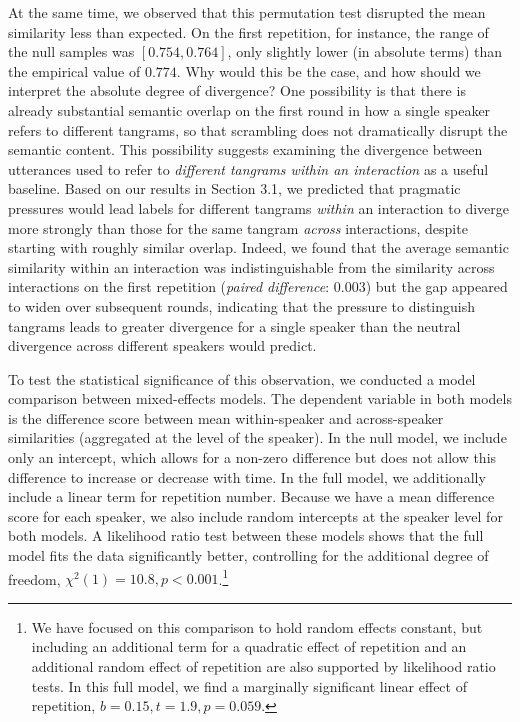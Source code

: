 \documentclass[alpha-refs]{wiley-article}
\begin{document}
At the same time, we observed that this permutation test disrupted the mean similarity less than expected.
On the first repetition, for instance, the range of the null samples was $[0.754, 0.764]$, only slightly lower (in absolute terms) than the empirical value of $0.774$.
Why would this be the case, and how should we interpret the absolute degree of divergence?
One possibility is that there is already substantial semantic overlap on the first round in how a single speaker refers to different tangrams, so that scrambling does not dramatically disrupt the semantic content.
This possibility suggests examining the divergence between utterances used to refer to \emph{different tangrams within an interaction} as a useful baseline.
Based on our results in Section 3.1, we predicted that pragmatic pressures would lead labels for different tangrams \emph{within} an interaction to diverge more strongly than those for the same tangram \emph{across} interactions, despite starting with roughly similar overlap.
Indeed, we found that the average semantic similarity within an interaction was indistinguishable from the similarity across interactions on the first repetition (\emph{paired difference}: $0.003$) but the gap appeared to widen over subsequent rounds, indicating that the pressure to distinguish tangrams leads to greater divergence for a single speaker than the neutral divergence across different speakers would predict.

To test the statistical significance of this observation, we conducted a model comparison between mixed-effects models.
The dependent variable in both models is the difference score between mean within-speaker and across-speaker similarities (aggregated at the level of the speaker).
In the null model, we include only an intercept, which allows for a non-zero difference but does not allow this difference to increase or decrease with time.
In the full model, we additionally include a linear term for repetition number.
Because we have a mean difference score for each speaker, we also include random intercepts at the speaker level for both models.
A likelihood ratio test between these models shows that the full model fits the data significantly better, controlling for the additional degree of freedom, $\chi^2(1) = 10.8, p < 0.001$.\footnote{We have focused on this comparison to hold random effects constant, but including an additional term for a quadratic effect of repetition and an additional random effect of repetition are also supported by likelihood ratio tests. In this full model, we find a marginally significant linear effect of repetition, $b = 0.15, t = 1.9, p = 0.059$.}
\end{document}
